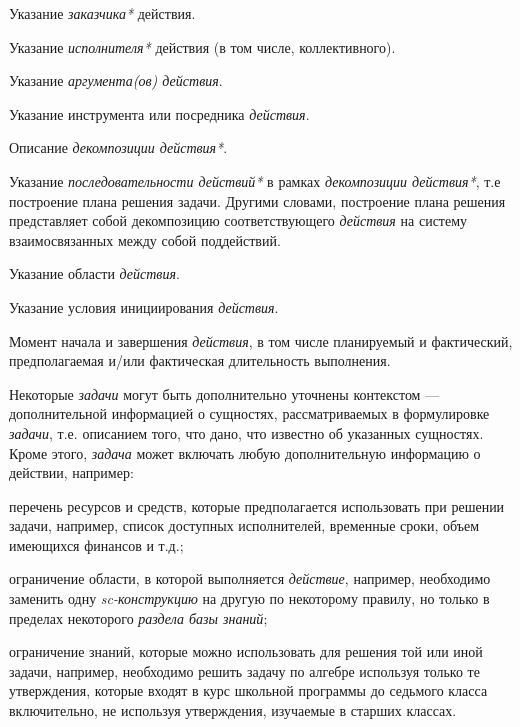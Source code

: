 \begin{SCn}
\begin{scnsubstruct}
{\begin{scnitemize}
                \item Указание \textit{заказчика*} действия.
                \item Указание \textit{исполнителя*} действия (в том числе, коллективного).
                \item Указание \textit{аргумента(ов) действия\scnrolesign}.
                \item Указание инструмента или посредника \textit{действия}.
                \item Описание \textit{декомпозиции действия*}.
                \item Указание \textit{последовательности действий*} в рамках \textit{декомпозиции действия*}, т.е построение плана решения задачи. Другими словами, построение плана решения представляет собой декомпозицию соответствующего \textit{действия} на систему взаимосвязанных между собой поддействий.
                \item Указание области \textit{действия}.
                \item Указание условия инициирования \textit{действия}.
                \item Момент начала и завершения \textit{действия}, в том числе планируемый и фактический, предполагаемая и/или фактическая длительность выполнения.
            \end{scnitemize}
            Некоторые \textit{задачи} могут быть дополнительно уточнены контекстом --- дополнительной информацией о сущностях, рассматриваемых в формулировке \textit{задачи}, т.е. описанием того, что дано, что известно об указанных сущностях.\\
            Кроме этого, \textit{задача} может включать любую дополнительную информацию о действии, например:
            \begin{scnitemize}
                \item перечень ресурсов и средств, которые предполагается использовать при решении задачи, например, список доступных исполнителей, временные сроки, объем имеющихся финансов и т.д.;
                \item ограничение области, в которой выполняется \textit{действие}, например, необходимо заменить одну \textit{\mbox{sc-конструкцию}} на другую по некоторому правилу, но только в пределах некоторого \textit{раздела базы знаний};
                \item ограничение знаний, которые можно использовать для решения той или иной задачи, например, необходимо решить задачу по алгебре используя только те утверждения, которые входят в курс школьной программы до седьмого класса включительно, не используя утверждения, изучаемые в старших классах.

\end{scnitemize}}
\end{scnsubstruct}
\end{SCn}
